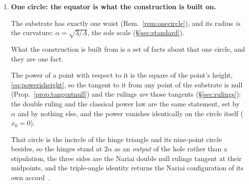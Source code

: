 \documentclass[11pt,a4paper]{article}
\theoremstyle{definition}
\begin{document}
\begin{enumerate}
permitted and not selected~\cite{JanzenMatter}. The same $A_2$ skeleton is realised in the geometry itself: the slicing paper draws the hexad as a skew hexagon of null rulings across the substrate's two horns, each horn's three vantage-hinges designating the three roots~\cite{JanzenSlicing}. Whether that geometric six-fold is the \emph{same} hexad as the seat triplet here---the one exchanged by the geometric time reflection, the other by the offset parity $R$, two distinct $\mathrm{O}(5,1)$ reflections that both swap the null rulings---or a resonance of shared abstract type, is \emph{settled} rather than open: the slicing paper establishes it as a resonance and \emph{not} an identity---the horn-swap $T$ (timelike, horn-flipping) and the offset parity $R$ (spacelike, horn-preserving) being distinct reflections that share the fundamental triple and complete it distinctly~\cite{JanzenSlicing}, verified on the six points. The chiral content this parity would grade is
not built here.
\item \textbf{One circle: the equator is what the construction is built on.} 

The substrate has exactly one waist (Rem.~\ref{rem:onecircle}), and its radius \emph{is} the curvature: $\alpha=\sqrt{3/\Lambda}$, the sole scale (\S\ref{sec:standard}). 

What the construction is built from is a set of facts about that one circle, and they are one fact. 

The power of a point with respect to it is the square of the point's height, \eqref{eq:powerisheight}, so the tangent to it from any point of the substrate is null (Prop.~\ref{prop:tangentnull}) and the rulings \emph{are} those tangents (\S\ref{sec:rulings}): the double ruling and the classical power law are the same statement, set by $\alpha$ and by nothing else, and the power vanishes identically on the circle itself ($x_{0}=0$). 

That circle is the incircle of the hinge triangle and its nine-point circle besides, so the hinges stand at $2\alpha$ as an \emph{output} of the hole rather than a stipulation, the three sides are the Nariai double null rulings tangent at their midpoints, and the triple-angle identity returns the Nariai configuration of its own accord~\cite{JanzenSlicing}. 


\end{enumerate}
\end{document}
